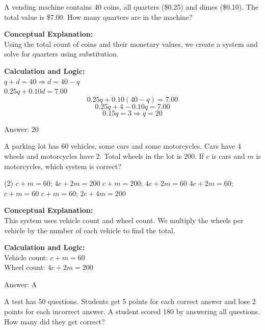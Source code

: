 \documentclass[11pt,paper=a4,answers]{exam}
\begin{document}
\begin{questions}
\question
A vending machine contains 40 coins, all quarters (\$0.25) and dimes (\$0.10). The total value is \$7.00. How many quarters are in the machine?

\begin{solution}
\textbf{Conceptual Explanation:} \\
Using the total count of coins and their monetary values, we create a system and solve for quarters using substitution.

\vspace{10pt}
\textbf{Calculation and Logic:} \\
$q + d = 40 \Rightarrow d = 40 - q$ \\
$0.25q + 0.10d = 7.00$ \\
\[0.25q + 0.10(40 - q) = 7.00\]
\[0.25q + 4 - 0.10q = 7.00\]
\[0.15q = 3 \Rightarrow q = 20\]

\vspace{15pt}
Answer: \colorbox{yellow!100}{20}
\end{solution}

\question
A parking lot has 60 vehicles, some cars and some motorcycles. Cars have 4 wheels and motorcycles have 2. Total wheels in the lot is 200. If $c$ is cars and $m$ is motorcycles, which system is correct?
\begin{tasks}(2)
    \task $c + m = 60$; $4c + 2m = 200$
    \task $c + m = 200$; $4c + 2m = 60$
    \task $4c + 2m = 60$; $c + m = 60$
    \task $c + m = 60$; $2c + 4m = 200$
\end{tasks}

\begin{solution}
\textbf{Conceptual Explanation:} \\
This system uses vehicle count and wheel count. We multiply the wheels per vehicle by the number of each vehicle to find the total.

\vspace{10pt}
\textbf{Calculation and Logic:} \\
Vehicle count: $c + m = 60$ \\
Wheel count: $4c + 2m = 200$

\vspace{15pt}
Answer: \colorbox{yellow!100}{A}
\end{solution}

\question
A test has 50 questions. Students get 5 points for each correct answer and lose 2 points for each incorrect answer. A student scored 180 by answering all questions. How many did they get correct?


\end{questions}
\end{document}
